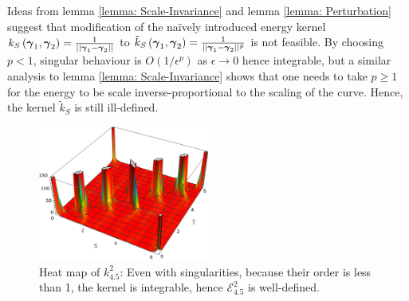 \documentclass[../dissertation.tex]{subfiles}
\begin{document}
\begin{remark}
    Ideas from lemma \ref{lemma: Scale-Invariance} and lemma \ref{lemma: Perturbation} suggest that modification of the na\"ively introduced energy kernel $k_S \left( \boldsymbol{\gamma}_1, \boldsymbol{\gamma}_2 \right) = \frac{1}{\lvert \lvert \boldsymbol{\gamma}_1 - \boldsymbol{\gamma}_2 \rvert \rvert}$ to $\tilde k_S \left( \boldsymbol{\gamma}_1, \boldsymbol{\gamma}_2 \right) = \frac{1}{\lvert \lvert \boldsymbol{\gamma}_1 - \boldsymbol{\gamma}_2 \rvert \rvert^p}$ is not feasible.
    By choosing $p < 1$, singular behaviour is $O \left( 1/\epsilon^p \right)$ as $\epsilon \rightarrow 0$ hence integrable,
    but a similar analysis to lemma \ref{lemma: Scale-Invariance} shows that
    one needs to take $p \geq 1$ for the energy to be scale inverse-proportional to the scaling of the curve.
    Hence, the kernel $\tilde k_S$ is still ill-defined.
\end{remark}

\begin{figure}[tpb]
    \centering
    \includegraphics[width=0.5\textwidth]{sections/tangentPointEnergyImgs/kHeatMap3}
    \caption{Heat map of $k_{4.5}^{2}$: Even with singularities, because their order is less than 1, the kernel is integrable, hence $\mathcal{E}_{4.5}^{2}$ is well-defined.}
    \label{fig: Low-Order Pole}
\end{figure}
\end{document}
